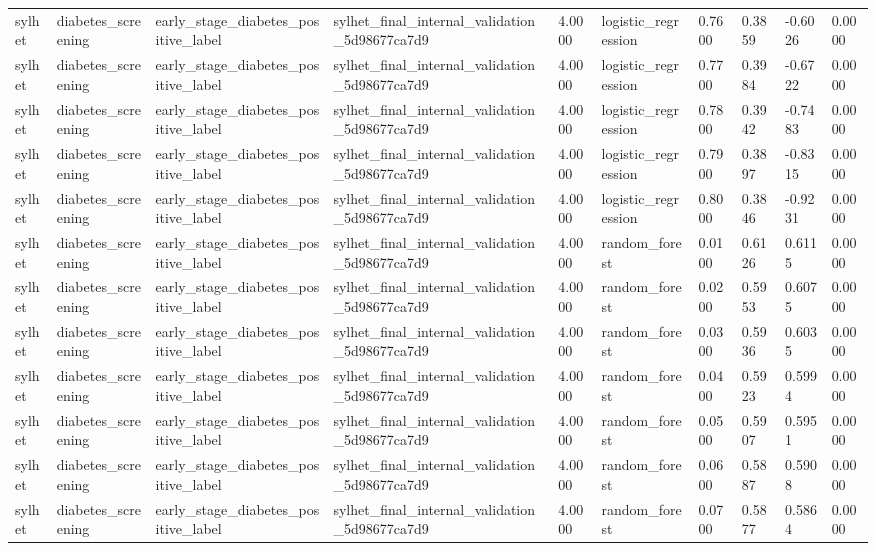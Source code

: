 \begin{tabular}{llllllllll}
sylhet & diabetes\_screening & early\_stage\_diabetes\_positive\_label & sylhet\_final\_internal\_validation\_5d98677ca7d9 & 4.0000 & logistic\_regression & 0.7600 & 0.3859 & -0.6026 & 0.0000 \\
sylhet & diabetes\_screening & early\_stage\_diabetes\_positive\_label & sylhet\_final\_internal\_validation\_5d98677ca7d9 & 4.0000 & logistic\_regression & 0.7700 & 0.3984 & -0.6722 & 0.0000 \\
sylhet & diabetes\_screening & early\_stage\_diabetes\_positive\_label & sylhet\_final\_internal\_validation\_5d98677ca7d9 & 4.0000 & logistic\_regression & 0.7800 & 0.3942 & -0.7483 & 0.0000 \\
sylhet & diabetes\_screening & early\_stage\_diabetes\_positive\_label & sylhet\_final\_internal\_validation\_5d98677ca7d9 & 4.0000 & logistic\_regression & 0.7900 & 0.3897 & -0.8315 & 0.0000 \\
sylhet & diabetes\_screening & early\_stage\_diabetes\_positive\_label & sylhet\_final\_internal\_validation\_5d98677ca7d9 & 4.0000 & logistic\_regression & 0.8000 & 0.3846 & -0.9231 & 0.0000 \\
sylhet & diabetes\_screening & early\_stage\_diabetes\_positive\_label & sylhet\_final\_internal\_validation\_5d98677ca7d9 & 4.0000 & random\_forest & 0.0100 & 0.6126 & 0.6115 & 0.0000 \\
sylhet & diabetes\_screening & early\_stage\_diabetes\_positive\_label & sylhet\_final\_internal\_validation\_5d98677ca7d9 & 4.0000 & random\_forest & 0.0200 & 0.5953 & 0.6075 & 0.0000 \\
sylhet & diabetes\_screening & early\_stage\_diabetes\_positive\_label & sylhet\_final\_internal\_validation\_5d98677ca7d9 & 4.0000 & random\_forest & 0.0300 & 0.5936 & 0.6035 & 0.0000 \\
sylhet & diabetes\_screening & early\_stage\_diabetes\_positive\_label & sylhet\_final\_internal\_validation\_5d98677ca7d9 & 4.0000 & random\_forest & 0.0400 & 0.5923 & 0.5994 & 0.0000 \\
sylhet & diabetes\_screening & early\_stage\_diabetes\_positive\_label & sylhet\_final\_internal\_validation\_5d98677ca7d9 & 4.0000 & random\_forest & 0.0500 & 0.5907 & 0.5951 & 0.0000 \\
sylhet & diabetes\_screening & early\_stage\_diabetes\_positive\_label & sylhet\_final\_internal\_validation\_5d98677ca7d9 & 4.0000 & random\_forest & 0.0600 & 0.5887 & 0.5908 & 0.0000 \\
sylhet & diabetes\_screening & early\_stage\_diabetes\_positive\_label & sylhet\_final\_internal\_validation\_5d98677ca7d9 & 4.0000 & random\_forest & 0.0700 & 0.5877 & 0.5864 & 0.0000 \\

\end{tabular}
